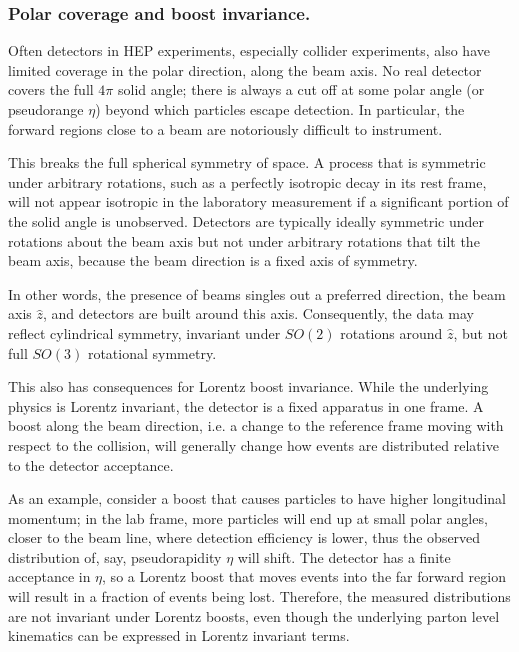         \subsubsection{Polar coverage and boost invariance.}
            Often detectors in HEP experiments, especially collider experiments, also have limited coverage in the polar direction, along the beam axis.
            No real detector covers the full $4\pi$ solid angle;
            there is always a cut off at some polar angle (or pseudorange $\eta$) beyond which particles escape detection.
            In particular, the forward regions close to a beam are notoriously difficult to instrument.
            
            This breaks the full spherical symmetry of space.
            A process that is symmetric under arbitrary rotations, such as a perfectly isotropic decay in its rest frame, will not appear isotropic in the laboratory measurement if a significant portion of the solid angle is unobserved.
            Detectors are typically ideally symmetric under rotations about the beam axis but not under arbitrary rotations that tilt the beam axis, because the beam direction is a fixed axis of symmetry.
            
            In other words, the presence of beams singles out a preferred direction, the beam axis $\hat{z}$, and detectors are built around this axis. Consequently, the data may reflect cylindrical symmetry, invariant under \(SO(2)\) rotations around $\hat{z}$, but not full $SO(3)$ rotational symmetry.
            
            This also has consequences for Lorentz boost invariance.
            While the underlying physics is Lorentz invariant, the detector is a fixed apparatus in one frame.
            A boost along the beam direction, i.e. a change to the reference frame moving with respect to the collision, will generally change how events are distributed relative to the detector acceptance.
            
            As an example, consider a boost that causes particles to have higher longitudinal momentum;
            in the lab frame, more particles will end up at small polar angles, closer to the beam line, where detection efficiency is lower, thus the observed distribution of, say, pseudorapidity $\eta$ will shift.
            The detector has a finite acceptance in $\eta$, so a Lorentz boost that moves events into the far forward region will result in a fraction of events being lost.
            Therefore, the measured distributions are not invariant under Lorentz boosts, even though the underlying parton level kinematics can be expressed in Lorentz invariant terms.
            
